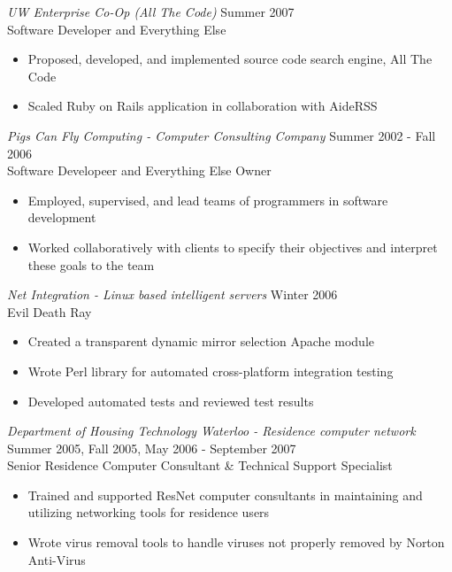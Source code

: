 \documentclass[10pt,line,margin=0.1]{newsres}
\begin{document}
\begin{resume}
\begin{itemize}
                   \end{itemize} 
                {\sl UW Enterprise Co-Op (All The Code)} \hfill Summer 2007 \\
                Software Developer and Everything Else
                \begin{itemize}  \itemsep -2pt %
                  \item{Proposed, developed, and implemented source code search engine, All The Code}
                  \item{Scaled Ruby on Rails application in collaboration with AideRSS}
                \end{itemize}
                {\sl Pigs Can Fly Computing - Computer Consulting Company} \hfill Summer 2002 - Fall 2006 \\
                Software Developeer and Everything Else Owner
                \begin{itemize}  \itemsep -2pt %
                  \item{Employed, supervised, and lead teams of programmers in software development}
                  \item{Worked collaboratively with clients to specify their objectives and interpret these goals to the team}
                \end{itemize}
                {\sl Net Integration - Linux based intelligent servers} \hfill Winter 2006 \\
                Evil Death Ray
                \begin{itemize}  \itemsep -2pt %
                  \item{Created a transparent dynamic mirror selection Apache module}
                  \item{Wrote Perl library for automated cross-platform integration testing}
                  \item{Developed automated tests and reviewed test results}
                \end{itemize}
                {\sl Department of Housing Technology Waterloo - Residence computer network} \hfill Summer 2005, Fall 2005, May 2006 - September 2007 \\
                Senior Residence Computer Consultant \& Technical Support Specialist
                \begin{itemize} \itemsep -2pt %
                  \item{Trained and supported ResNet computer consultants in maintaining and utilizing networking tools for residence users}
                  \item{Wrote virus removal tools to handle viruses not properly removed by Norton Anti-Virus}
                 \end{itemize}


\end{resume}
\end{document}
